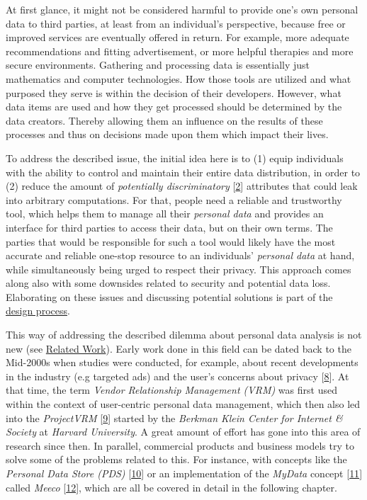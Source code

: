 \documentclass[12pt,english,a4paper,titlepage,cleardoublepage=empty,dottedtoc]{report}
\begin{document}
At first glance, it might not be considered harmful to provide one's own
personal data to third parties, at least from an individual's
perspective, because free or improved services are eventually offered in
return. For example, more adequate recommendations and fitting
advertisement, or more helpful therapies and more secure environments.
Gathering and processing data is essentially just mathematics and
computer technologies. How those tools are utilized and what purposed
they serve is within the decision of their developers. However, what
data items are used and how they get processed should be determined by
the data creators. Thereby allowing them an influence on the results of
these processes and thus on decisions made upon them which impact their
lives.

To address the described issue, the initial idea here is to (1) equip
individuals with the ability to control and maintain their entire data
distribution, in order to (2) reduce the amount of \emph{potentially
discriminatory}
{[}\protect\hyperlink{ref-paper_2008_discrimination-aware-data-mining}{2}{]}
attributes that could leak into arbitrary computations. For that, people
need a reliable and trustworthy tool, which helps them to manage all
their \emph{personal data} and provides an interface for third parties
to access their data, but on their own terms. The parties that would be
responsible for such a tool would likely have the most accurate and
reliable one-stop resource to an individuals' \emph{personal data} at
hand, while simultaneously being urged to respect their privacy. This
approach comes along also with some downsides related to security and
potential data loss. Elaborating on these issues and discussing
potential solutions is part of the
\protect\hyperlink{design-discussion}{design process}.

This way of addressing the described dilemma about personal data
analysis is not new (see \protect\hyperlink{related-work}{Related
Work}). Early work done in this field can be dated back to the Mid-2000s
when studies were conducted, for example, about recent developments in
the industry (e.g targeted ads) and the user's concerns about privacy
{[}\protect\hyperlink{ref-study_2004_architecture-for-privacy-sensitive-ubiquitous-computing}{8}{]}.
At that time, the term \emph{Vendor Relationship Management (VRM)} was
first used within the context of user-centric personal data management,
which then also led into the \emph{ProjectVRM}
{[}\protect\hyperlink{ref-web_2010_projectvrm_about}{9}{]} started by
the \emph{Berkman Klein Center for Internet \& Society} at \emph{Harvard
University}. A great amount of effort has gone into this area of
research since then. In parallel, commercial products and business
models try to solve some of the problems related to this. For instance,
with concepts like the \emph{Personal Data Store (PDS)}
{[}\protect\hyperlink{ref-paper_2013_the-personal-data-store-approach-to-personal-data-security_2013}{10}{]}
or an implementation of the \emph{MyData} concept
{[}\protect\hyperlink{ref-whitepaper_2014_mydata-a-nordic-model-for-human-centered-personal-data-management-and-processing}{11}{]}
called \emph{Meeco}
{[}\protect\hyperlink{ref-web_2016_meeco-how-it-works}{12}{]}, which are
all be covered in detail in the following chapter.
\end{document}
